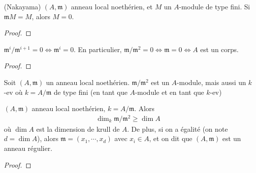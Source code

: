             \begin{lemm} (Nakayama)
                $(A, \mathfrak{m})$ anneau local noethérien, et $M$ un $A$-module de type fini. Si $\mathfrak{m} M = M$, alors $M = 0$.
            \end{lemm}
            \begin{proof}
            \end{proof}
            \begin{coro}
                $\mathfrak{m}^i/ \mathfrak{m}^{i+1} = 0 \iff \mathfrak{m}^i = 0$. En particulier, $\mathfrak{m}/\mathfrak{m}^2 = 0 \iff \mathfrak{m} = 0 \iff A$ est un corps.
            \end{coro}
            \begin{proof}
            \end{proof}
            \begin{remq}
                Soit $(A, \mathfrak{m})$ un anneau local noethérien. $\mathfrak{m}/\mathfrak{m}^2$ est un $A$-module, mais aussi un $k$-ev où $k = A/\mathfrak{m}$ de type fini (en tant que $A$-module et en tant que $k$-ev)
            \end{remq}
            \begin{theo}
                $(A, \mathfrak{m})$ anneau local noethérien, $k = A/\mathfrak{m}$. Alors
                \begin{align*}
                    \dim_k \mathfrak{m}/\mathfrak{m}^2 \geq \dim A
                \end{align*}
                où $\dim A$ est la dimension de krull de $A$. De plus, si on a égalité (on note $d = \dim A$), alors $\mathfrak{m} = (x_1, \cdots ,x_d)$ avec $x_i \in A$, et on dit que $(A, \mathfrak{m})$ est un anneau régulier.
            \end{theo}
            \begin{proof}
            \end{proof}
        
